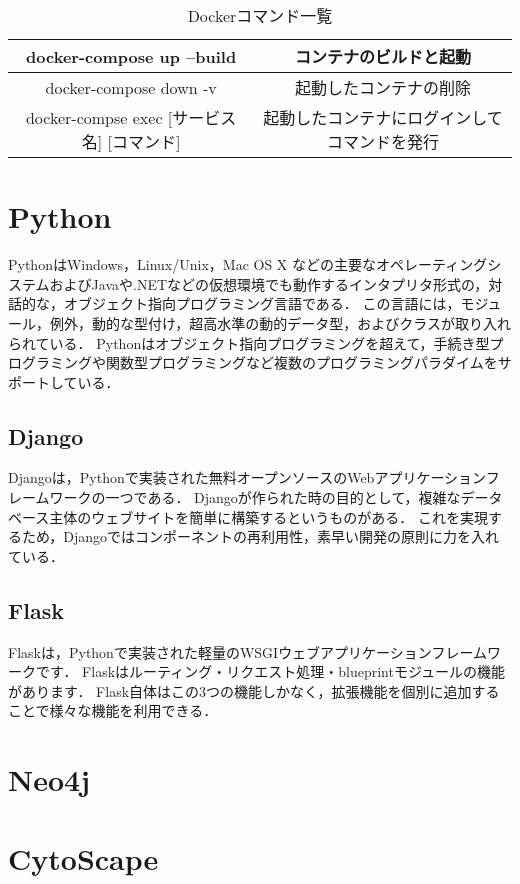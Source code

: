 \begin{table}[htb]
\centering
\caption{Dockerコマンド一覧}
\label{tab:docker_cmd}
\begin{tabular}{|c|c|}  \hline
    docker-compose up --build & コンテナのビルドと起動 \\ \hline
    docker-compose down -v & 起動したコンテナの削除 \\ \hline
    docker-compse exec [サービス名] [コマンド] & 起動したコンテナにログインしてコマンドを発行 \\ \hline		  
\end{tabular}
\end{table}

\section{Python}\label{sec:python}
Python\cite{python}はWindows，Linux/Unix，Mac OS X などの主要なオペレーティングシステムおよびJavaや.NETなどの仮想環境でも動作するインタプリタ形式の，対話的な，オブジェクト指向プログラミング言語である．
この言語には，モジュール，例外，動的な型付け，超高水準の動的データ型，およびクラスが取り入れられている．
Pythonはオブジェクト指向プログラミングを超えて，手続き型プログラミングや関数型プログラミングなど複数のプログラミングパラダイムをサポートしている．

\subsection{Django}
Django\cite{Django}は，Pythonで実装された無料オープンソースのWebアプリケーションフレームワークの一つである．
Djangoが作られた時の目的として，複雑なデータベース主体のウェブサイトを簡単に構築するというものがある．
これを実現するため，Djangoではコンポーネントの再利用性，素早い開発の原則に力を入れている．

\subsection{Flask}
Flask\cite{flask}は，Pythonで実装された軽量のWSGI\cite{wsgi}ウェブアプリケーションフレームワークです．
Flaskはルーティング・リクエスト処理・blueprintモジュールの機能があります．
Flask自体はこの3つの機能しかなく，拡張機能を個別に追加することで様々な機能を利用できる．

\section{Neo4j}\label{sec:neo4j}

\section{CytoScape}\label{sec:cyto}
